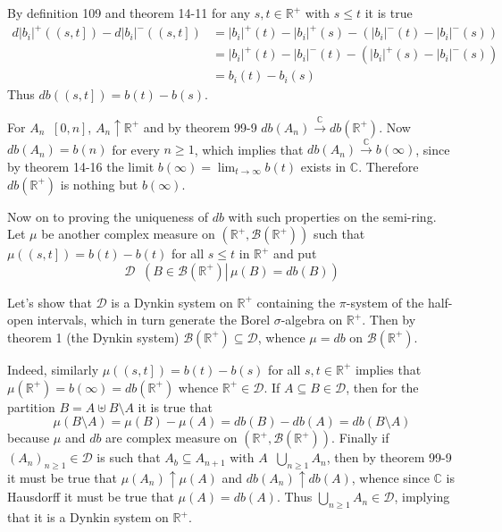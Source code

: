 \documentclass[a4paper]{article}
\newcommand{\clo}[1]{\left [ #1 \right ]}
\newcommand{\ploc}[1]{\left ( #1 \right ]}
\newcommand{\brac}[1]{\left ( #1 \right )}
\newcommand{\induc}[1]{\left . #1 \right \vert}
\newcommand{\abs}[1]{\left | #1 \right |}
\newcommand{\Real}{\mathbb{R}}
\newcommand{\Cplx}{\mathbb{C}}
\newcommand{\Dcal}{\mathcal{D}}
\newcommand{\borel}[1]{\mathcal{B}\brac{#1}}
\newcommand{\defn}{\mathop{\overset{\Delta}{=}}\nolimits}
\begin{document}
By definition 109 and theorem 14-11 for any $s,t\in\Real^+$ with $s\leq t$ it is true \begin{align*}d\abs{b_i}^+\brac{\ploc{s,t}}-d\abs{b_i}^-\brac{\ploc{s,t}} &=\abs{b_i}^+\brac{t}-\abs{b_i}^+\brac{s} - \brac{\abs{b_i}^-\brac{t}-\abs{b_i}^-\brac{s}}\\&=\abs{b_i}^+\brac{t}-\abs{b_i}^-\brac{t} - \brac{\abs{b_i}^+\brac{s}-\abs{b_i}^-\brac{s}}\\&= b_i\brac{t}-b_i\brac{s}\end{align*} Thus $db\brac{\ploc{s,t}}=b\brac{t}-b\brac{s}$.

For $A_n\defn \clo{0,n}$, $A_n\uparrow \Real^+$ and by theorem 99-9 $db\brac{A_n}\overset{\Cplx}{\to}db\brac{\Real^+}$. Now $db\brac{A_n} = b\brac{n}$ for every $n\geq1$, which implies that $db\brac{A_n}\overset{\Cplx}{\to} b\brac{\infty}$, since by theorem 14-16 the limit $b\brac{\infty}=\lim_{t\to\infty}b\brac{t}$ exists in $\Cplx$. Therefore $db\brac{\Real^+}$ is nothing but $b\brac{\infty}$.

Now on to proving the uniqueness of $db$ with such properties on the semi-ring.
Let $\mu$ be another complex measure on $\brac{\Real^+,\borel{\Real^+}}$ such that $\mu\brac{\ploc{s,t}}=b\brac{t}-b\brac{t}$ for all $s\leq t$ in $\Real^+$ and put \[\Dcal\defn \brac{\induc{B\in \borel{\Real^+}}\, \mu\brac{B} = db\brac{B}}\]

Let's show that $\Dcal$ is a Dynkin system on $\Real^+$ containing the $\pi$-system of the half-open intervals, which in turn generate the Borel $\sigma$-algebra on $\Real^+$. Then by theorem 1 (the Dynkin system) $\borel{\Real^+}\subseteq \Dcal$, whence $\mu = db$ on $\borel{\Real^+}$.

Indeed, similarly $\mu\brac{\ploc{s,t}}=b\brac{t}-b\brac{s}$ for all $s,t\in \Real^+$ implies that $\mu\brac{\Real^+} = b\brac{\infty} = db\brac{\Real^+}$ whence $\Real^+\in \Dcal$. If $A\subseteq B\in \Dcal$, then for the partition $B = A \uplus B\setminus A$ it is true that \[\mu\brac{B\setminus A}=\mu\brac{B}-\mu\brac{A}=db\brac{B}-db\brac{A}=db\brac{B\setminus A}\] because $\mu$ and $db$ are complex measure on $\brac{\Real^+,\borel{\Real^+}}$. Finally if $\brac{A_n}_{n\geq1}\in \Dcal$ is such that $A_b\subseteq A_{n+1}$ with $A\defn \bigcup_{n\geq1} A_n$, then by theorem 99-9 it must be true that $\mu\brac{A_n}\uparrow \mu\brac{A}$ and $db\brac{A_n}\uparrow db\brac{A}$, whence since $\Cplx$ is Hausdorff it must be true that $\mu\brac{A}=db\brac{A}$. Thus $\bigcup_{n\geq1} A_n\in \Dcal$, implying that it is a Dynkin system on $\Real^+$.
\end{document}
